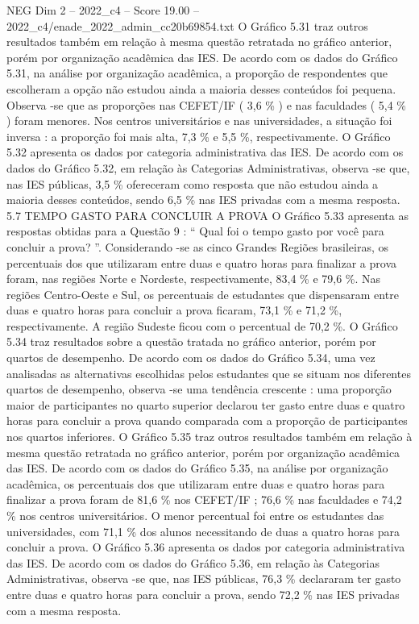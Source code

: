 \begin{textsample}{NEG Dim 2 – 2022\_c4 – Score 19.00 – 2022\_c4/enade\_2022\_admin\_cc20b69854.txt}
O Gráfico 5.31 traz outros resultados também em relação à mesma questão retratada no gráfico anterior, porém por organização acadêmica das IES.
De acordo com os dados do Gráfico 5.31, na análise por organização acadêmica, a proporção de respondentes que escolheram a opção não estudou ainda a maioria desses conteúdos foi pequena.
Observa -se que as proporções nas CEFET/IF ( 3,6 \% ) e nas faculdades ( 5,4 \% ) foram menores.
Nos centros universitários e nas universidades, a situação foi inversa : a proporção foi mais alta, 7,3 \% e 5,5 \%, respectivamente.
O Gráfico 5.32 apresenta os dados por categoria administrativa das IES.
De acordo com os dados do Gráfico 5.32, em relação às Categorias Administrativas, observa -se que, nas IES públicas, 3,5 \% ofereceram como resposta que não estudou ainda a maioria desses conteúdos, sendo 6,5 \% nas IES privadas com a mesma resposta. 5.7 TEMPO GASTO PARA CONCLUIR A PROVA O Gráfico 5.33 apresenta as respostas obtidas para a Questão 9 : “ Qual foi o tempo gasto por você para concluir a prova? ”.
Considerando -se as cinco Grandes Regiões brasileiras, os percentuais dos que utilizaram entre duas e quatro horas para finalizar a prova foram, nas regiões Norte e Nordeste, respectivamente, 83,4 \% e 79,6 \%.
Nas regiões Centro-Oeste e Sul, os percentuais de estudantes que dispensaram entre duas e quatro horas para concluir a prova ficaram, 73,1 \% e 71,2 \%, respectivamente.
A região Sudeste ficou com o percentual de 70,2 \%.
O Gráfico 5.34 traz resultados sobre a questão tratada no gráfico anterior, porém por quartos de desempenho.
De acordo com os dados do Gráfico 5.34, uma vez analisadas as alternativas escolhidas pelos estudantes que se situam nos diferentes quartos de desempenho, observa -se uma tendência crescente : uma proporção maior de participantes no quarto superior declarou ter gasto entre duas e quatro horas para concluir a prova quando comparada com a proporção de participantes nos quartos inferiores.
O Gráfico 5.35 traz outros resultados também em relação à mesma questão retratada no gráfico anterior, porém por organização acadêmica das IES.
De acordo com os dados do Gráfico 5.35, na análise por organização acadêmica, os percentuais dos que utilizaram entre duas e quatro horas para finalizar a prova foram de 81,6 \% nos CEFET/IF ; 76,6 \% nas faculdades e 74,2 \% nos centros universitários.
O menor percentual foi entre os estudantes das universidades, com 71,1 \% dos alunos necessitando de duas a quatro horas para concluir a prova.
O Gráfico 5.36 apresenta os dados por categoria administrativa das IES.
De acordo com os dados do Gráfico 5.36, em relação às Categorias Administrativas, observa -se que, nas IES públicas, 76,3 \% declararam ter gasto entre duas e quatro horas para concluir a prova, sendo 72,2 \% nas IES privadas com a mesma resposta.

\end{textsample}
